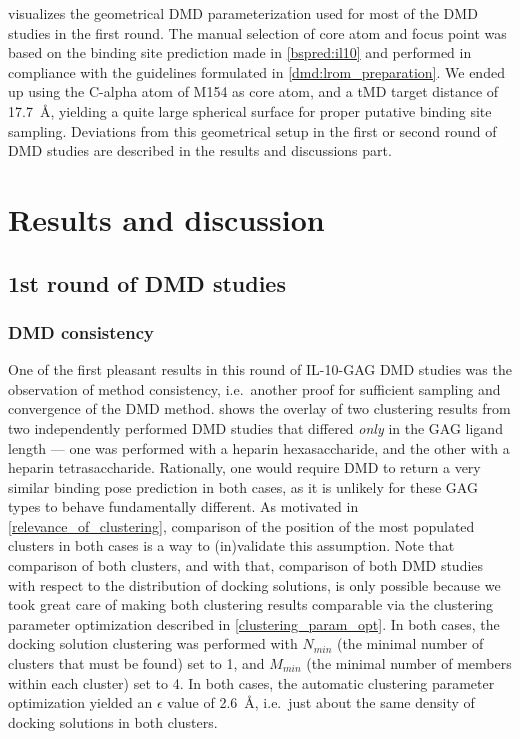  visualizes the geometrical DMD
parameterization used for most of the DMD studies in the first round. The manual
selection of core atom and focus point was based on the binding site prediction
made in \cref{bspred:il10} and performed in compliance with the guidelines
formulated in \cref{dmd:lrom_preparation}. We ended up using the C-alpha atom of
M154 as core atom, and a tMD target distance of \SI{17.7}{\angstrom}, yielding a
quite large spherical surface for proper putative binding site sampling.
Deviations from this geometrical setup in the first or second round of DMD
studies are described in the results and discussions part.


\section{Results and discussion}

\subsection{1st round of DMD studies}

\subsubsection{DMD consistency}

One of the first pleasant results in this round of IL-10-GAG DMD studies was the
observation of method consistency, i.e.\ another proof for sufficient sampling
and convergence of the DMD method.
 shows the overlay
of two clustering results from two independently performed DMD studies that
differed \textit{only} in the GAG ligand length --- one was performed with a
heparin hexasaccharide, and the other with a heparin tetrasaccharide.
Rationally, one would require DMD to return a very similar binding pose
prediction in both cases, as it is unlikely for these GAG types to behave
fundamentally different. As motivated in \cref{relevance_of_clustering},
comparison of the position of the most populated clusters in both cases is a way
to (in)validate this assumption. Note that comparison of both clusters, and with
that, comparison of both DMD studies with respect to the distribution of docking
solutions, is only possible because we took great care of making both clustering
results comparable via the clustering parameter optimization described in
\cref{clustering_param_opt}. In both cases, the docking solution clustering was
performed with $N_{min}$ (the minimal number of clusters that must be found) set
to 1, and $M_{min}$ (the minimal number of members within each cluster) set to
4. In both cases, the automatic clustering parameter optimization yielded an
   $\epsilon$ value of \SI{2.6}{\angstrom}, i.e.\ just about the same density of
   docking solutions in both clusters.

